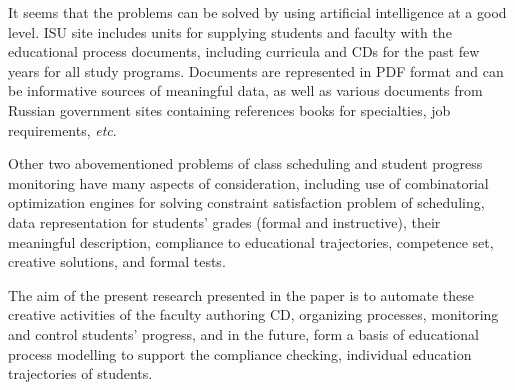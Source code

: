 \documentclass[
]{aiitart}
\begin{document}
It seems that the problems can be solved by using artificial intelligence at a good level.  ISU site includes units for supplying students and faculty with the educational process documents, including curricula and CDs for the past few years for all study programs.  Documents are represented in PDF format and can be informative sources of meaningful data, as well as various documents from Russian government sites containing references books for specialties, job requirements, {\em etc}.

Other two abovementioned problems of class scheduling and student progress monitoring have many aspects of consideration, including use of combinatorial optimization engines for solving constraint satisfaction problem of scheduling, data representation for students' grades (formal and instructive), their meaningful description, compliance to educational trajectories, competence set, creative solutions, and formal tests.




The aim of the present research presented in the paper is to automate these creative activities of the faculty authoring CD, organizing processes, monitoring and control students' progress, and in the future, form a basis of educational process modelling to support the compliance checking, individual education trajectories of students.
\end{document}

